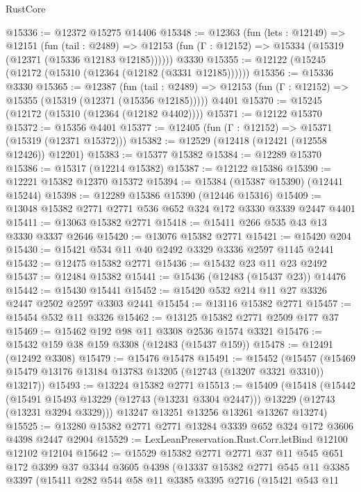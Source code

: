 \begin{lexlean}{RustCore}
\begin{coremodule}
@15336 := @12372 @15275 @14406
@15348 := @12363
    (fun (lets : @12149) =>
    @12151
      (fun (tail : @2489) =>
      @12153 (fun (Γ : @12152) => @15334 (@15319 (@12371 (@15336 @12183 @12185))))))
    @3330
@15355 := @12122 (@15245 (@12172 (@15310 (@12364 (@12182 (@3331 @12185))))))
@15356 := @15336 @3330
@15365 := @12387
    (fun (tail : @2489) => @12153 (fun (Γ : @12152) => @15355 (@15319 (@12371 (@15356 @12185)))))
    @4401
@15370 := @15245 (@12172 (@15310 (@12364 (@12182 @4402))))
@15371 := @12122 @15370
@15372 := @15356 @4401
@15377 := @12405 (fun (Γ : @12152) => @15371 (@15319 (@12371 @15372)))
@15382 := @12529 (@12418 (@12421 (@12558 @12426)) @12201)
@15383 := @15377 @15382
@15384 := @12289 @15370
@15386 := @15317 (@12214 @15382)
@15387 := @12122 @15386
@15390 := @12221 @15382 @12370 @15372
@15394 := @15384 (@15387 @15390) (@12441 @15244)
@15398 := @12289 @15386 @15390 (@12446 @15316)
@15409 := @13048 @15382 @2771 @2771 @536 @652 @324 @172 @3330 @3339 @2447 @4401
@15411 := @13063 @15382 @2771
@15418 := @15411 @266 @535 @43 @13 @3330 @3337 @2646
@15420 := @13076 @15382 @2771
@15421 := @15420 @204
@15430 := @15421 @534 @11 @40 @2492 @3329 @3336 @2597 @1145 @2441
@15432 := @12475 @15382 @2771
@15436 := @15432 @23 @11 @23 @2492
@15437 := @12484 @15382
@15441 := @15436 (@12483 (@15437 @23)) @14476
@15442 := @15430 @15441
@15452 := @15420 @532 @214 @11 @27 @3326 @2447 @2502 @2597 @3303 @2441
@15454 := @13116 @15382 @2771
@15457 := @15454 @532 @11 @3326
@15462 := @13125 @15382 @2771 @2509 @177 @37
@15469 := @15462 @192 @98 @11 @3308 @2536 @1574 @3321
@15476 := @15432 @159 @38 @159 @3308 (@12483 (@15437 @159))
@15478 := @12491 (@12492 @3308)
@15479 := @15476 @15478
@15491 := @15452
    (@15457 (@15469 @15479 @13176 @13184 @13783 @13205 (@12743 (@13207 @3321 @3310)) @13217))
@15493 := @13224 @15382 @2771
@15513 := @15409
    (@15418
      (@15442
        (@15491 @15493 @13229 (@12743 (@13231 @3304 @2447)))
        @13229
        (@12743 (@13231 @3294 @3329)))
      @13247
      @13251
      @13256
      @13261
      @13267
      @13274)
@15525 := @13280 @15382 @2771 @2771 @13284 @3339 @652 @324 @172 @3606 @4398 @2447 @2904
@15529 := LexLeanPreservation.Rust.Corr.letBind @12100 @12102 @12104
@15642 := @15529
    @15382
    @2771
    @2771
    @37
    @11
    @545
    @651
    @172
    @3399
    @37
    @3344
    @3605
    @4398
    (@13337
      @15382
      @2771
      @545
      @11
      @3385
      @3397
      (@15411
        @282
        @544
        @58
        @11
        @3385
        @3395
        @2716
        (@15421
          @543
          @11

\end{coremodule}
\end{lexlean}
